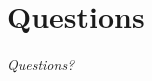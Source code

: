 \documentclass{beamer}
\begin{document}




\section*{Questions}
\begin{frame}{}
  \centering \Huge
  \emph{Questions?}
\end{frame}
\end{document}
